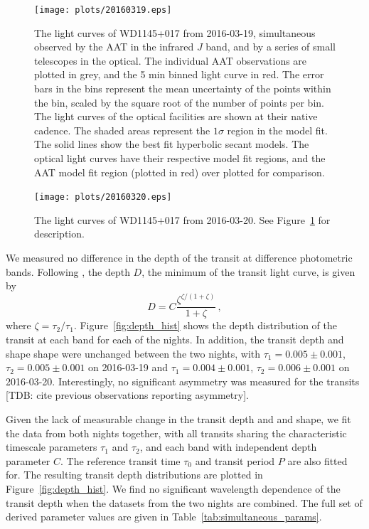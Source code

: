\documentclass[iop,useAMES,usenatbig]{emulateapj}
\begin{document}
\begin{figure}
    \centering
    \texttt{[image: plots/20160319.eps]}
    \caption{The light curves of WD1145+017 from 2016-03-19, simultaneous observed by the AAT in the infrared $J$ band, and by a series of small telescopes in the optical. The individual AAT observations are plotted in grey, and the 5 min binned light curve in red. The error bars in the bins represent the mean uncertainty of the points within the bin, scaled by the square root of the number of points per bin. The light curves of the optical facilities are shown at their native cadence. The shaded areas represent the $1\sigma$ region in the model fit. The solid lines show the best fit hyperbolic secant models. The optical light curves have their respective model fit regions, and the AAT model fit region (plotted in red) over plotted for comparison.}
    \label{fig:lc_20160319}
\end{figure}

\begin{figure}
    \centering
    \texttt{[image: plots/20160320.eps]}
    \caption{The light curves of WD1145+017 from 2016-03-20. See Figure~\ref{fig:lc_20160319} for description. }
    \label{fig:lc_20160320}
\end{figure}

We measured no difference in the depth of the transit at difference photometric bands. Following \citet{2015arXiv151006434C}, the depth $D$, the minimum of the transit light curve, is given by 
\begin{equation}
D = C \frac{\zeta^{\zeta/(1+\zeta)} }{1+\zeta}\,,
\end{equation}
where $\zeta = \tau_2/\tau_1$. Figure~\ref{fig:depth_hist} shows the depth distribution of the transit at each band for each of the nights. In addition, the transit depth and shape shape were unchanged between the two nights, with $\tau_1 = 0.005\pm0.001$, $\tau_2 = 0.005\pm0.001$ on 2016-03-19 and $\tau_1 = 0.004\pm0.001$, $\tau_2 = 0.006\pm0.001$ on 2016-03-20. Interestingly, no significant asymmetry was measured for the transits [TDB: cite previous observations reporting asymmetry].

Given the lack of measurable change in the transit depth and and shape, we fit the data from both nights together, with all transits sharing the characteristic timescale parameters $\tau_1$ and $\tau_2$, and each band with independent depth parameter $C$. The reference transit time $\tau_0$ and transit period $P$ are also fitted for. The resulting transit depth distributions are plotted in Figure~\ref{fig:depth_hist}. We find no significant wavelength dependence of the transit depth when the datasets from the two nights are combined. The full set of derived parameter values are given in Table~\ref{tab:simultaneous_params}.
\end{document}
